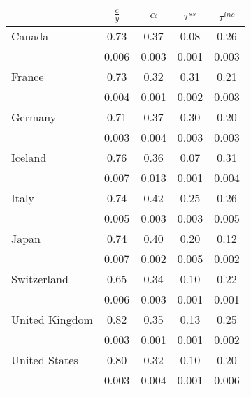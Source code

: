 \begin{tabular}{lcccc}
& \multicolumn{1}{c}{$\displaystyle \frac{c}{y}$}
& \multicolumn{1}{c}{$\alpha$}
& \multicolumn{1}{c}{$\tau^{ss}$}
& \multicolumn{1}{c}{$\tau^{inc}$} \\[1em]
\hline
\hline
Canada     & 0.73       & 0.37        & 0.08          & 0.26     \\
            & 0.006      & 0.003       & 0.001         & 0.003     \\
France     & 0.73       & 0.32        & 0.31          & 0.21     \\
            & 0.004      & 0.001       & 0.002         & 0.003     \\
Germany     & 0.71       & 0.37        & 0.30          & 0.20     \\
            & 0.003      & 0.004       & 0.003         & 0.003     \\
Iceland     & 0.76       & 0.36        & 0.07          & 0.31     \\
            & 0.007      & 0.013       & 0.001         & 0.004     \\
Italy     & 0.74       & 0.42        & 0.25          & 0.26     \\
            & 0.005      & 0.003       & 0.003         & 0.005     \\
Japan     & 0.74       & 0.40        & 0.20          & 0.12     \\
            & 0.007      & 0.002       & 0.005         & 0.002     \\
Switzerland     & 0.65       & 0.34        & 0.10          & 0.22     \\
            & 0.006      & 0.003       & 0.001         & 0.001     \\
United Kingdom     & 0.82       & 0.35        & 0.13          & 0.25     \\
            & 0.003      & 0.001       & 0.001         & 0.002     \\
United States      & 0.80       & 0.32        & 0.10          & 0.20     \\
            & 0.003      & 0.004       & 0.001         & 0.006     \\
\hline
\end{tabular}
